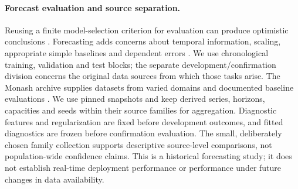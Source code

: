 \paragraph{Forecast evaluation and source separation.}
Reusing a finite model-selection criterion for evaluation can produce
optimistic conclusions \citep{Cawley2010Selection}. Forecasting adds concerns
about temporal information, scaling, appropriate simple baselines and
dependent errors \citep{Hewamalage2023Evaluation}. We use chronological
training, validation and test blocks; the separate development/confirmation
division concerns the original data sources from which those tasks arise.
The Monash archive supplies datasets from varied domains and documented
baseline evaluations \citep{Godahewa2021Monash}. We use pinned snapshots and
keep derived series, horizons, capacities and seeds within their source
families for aggregation. Diagnostic features and regularization are fixed
before development outcomes, and fitted diagnostics are frozen before
confirmation evaluation. The small, deliberately chosen family collection
supports descriptive source-level comparisons, not population-wide
confidence claims. This is a historical forecasting study; it does not
establish real-time deployment performance or performance under future
changes in data availability.
